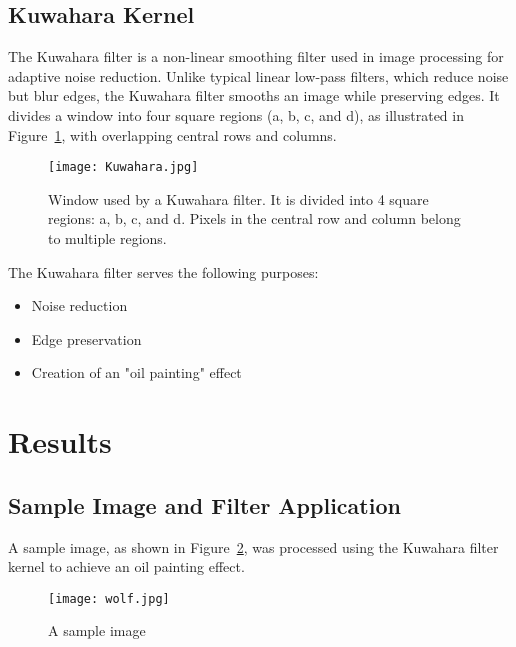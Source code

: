 \documentclass{article}
\begin{document}
    \subsection{Kuwahara Kernel}
    The Kuwahara filter is a non-linear smoothing filter used in image processing for adaptive noise reduction. Unlike typical linear low-pass filters, which reduce noise but blur edges, the Kuwahara filter smooths an image while preserving edges. It divides a window into four square regions (a, b, c, and d), as illustrated in Figure~\ref{fig:kuwahara-window}, with overlapping central rows and columns.

    \begin{figure}
        \centering
        \texttt{[image: Kuwahara.jpg]}
        \caption{Window used by a Kuwahara filter. It is divided into 4 square regions: a, b, c, and d. Pixels in the central row and column belong to multiple regions.}
        \label{fig:kuwahara-window}
    \end{figure}

    The Kuwahara filter serves the following purposes:
    \begin{itemize}
        \item Noise reduction
        \item Edge preservation
        \item Creation of an "oil painting" effect
    \end{itemize}

\section{Results}

    \subsection{Sample Image and Filter Application}
    A sample image, as shown in Figure~\ref{fig:sample-image}, was processed using the Kuwahara filter kernel to achieve an oil painting effect.

    \begin{figure}[H]
        \centering
        \texttt{[image: wolf.jpg]}
        \caption{A sample image}
        \label{fig:sample-image}
    \end{figure}

\end{document}

